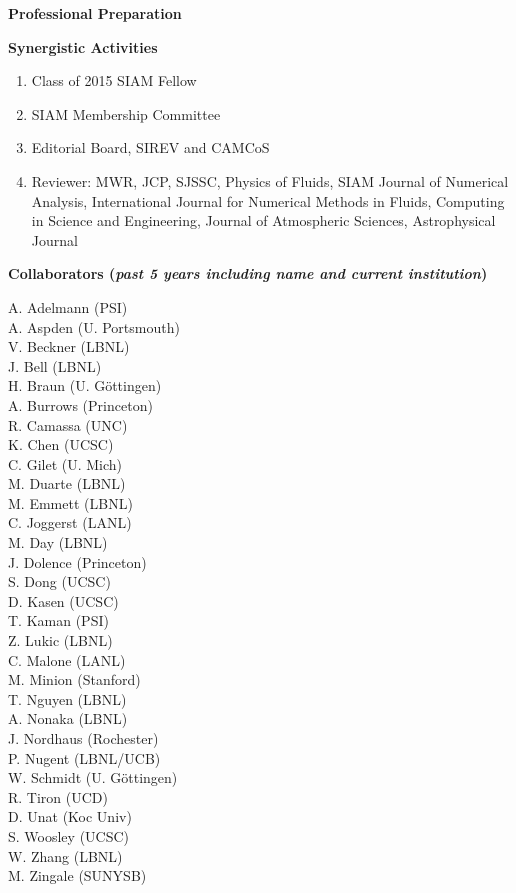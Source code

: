 \documentclass[11pt,letterpaper,english]{article}
\begin{document}
\begin{flushleft} {\bf Professional Preparation}

\newpage

{\bf Synergistic Activities}
\vspace{-6pt}
\begin{enumerate} \itemsep1pt \parskip0pt 
\item Class of 2015 SIAM Fellow 
\item SIAM Membership Committee 
\item Editorial Board, SIREV and CAMCoS 
\item Reviewer: MWR,  JCP, SJSSC, Physics of Fluids, SIAM Journal of Numerical Analysis, International Journal for Numerical Methods in Fluids,
                Computing in Science and Engineering, Journal of Atmospheric Sciences, Astrophysical Journal

\end{enumerate} 

\vspace{-6pt}
{\bf Collaborators ({\emph{past 5 years including name and current institution}})} 
{\parindent 12pt

A. Adelmann (PSI)\\
A. Aspden (U. Portsmouth)\\
V. Beckner (LBNL)\\
J. Bell (LBNL)\\
H. Braun (U. G\"{o}ttingen)\\
A. Burrows (Princeton)\\
R. Camassa (UNC)\\
K. Chen (UCSC)\\
C. Gilet (U. Mich)\\
M. Duarte (LBNL)\\
M. Emmett (LBNL)\\
C. Joggerst (LANL)\\
M. Day (LBNL)\\
J. Dolence (Princeton)\\
S. Dong (UCSC)\\
D. Kasen (UCSC)\\
T. Kaman (PSI)\\
Z. Lukic (LBNL)\\
C. Malone (LANL)\\
M. Minion (Stanford)\\
T. Nguyen (LBNL)\\
A. Nonaka (LBNL)\\
J. Nordhaus (Rochester)\\
P. Nugent (LBNL/UCB)\\
W. Schmidt (U. G\"{o}ttingen)\\
R. Tiron (UCD)\\
D. Unat (Koc Univ)\\
S. Woosley (UCSC)\\
W. Zhang (LBNL)\\
M. Zingale (SUNYSB)
}


\end{flushleft}
\end{document}
